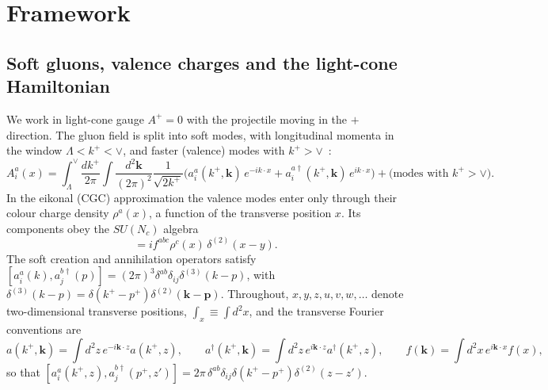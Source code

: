 \section{Framework}\label{sec:framework}

\subsection{Soft gluons, valence charges and the light-cone Hamiltonian}\label{sec:hamiltonian}

We work in light-cone gauge $A^+=0$ with the projectile moving in the $+$ direction. The gluon field is split into soft modes, with longitudinal momenta in the window $\Lambda<k^+<\vee$, and faster (valence) modes with $k^+>\vee$~\cite{Kovner:2005nq,Lublinsky:2016meo}:
\begin{equation}
A_i^a(x)=\int_{\Lambda}^{\vee}\frac{dk^+}{2\pi}\int\frac{d^2\mathbf k}{(2\pi)^2}\frac{1}{\sqrt{2k^+}}\Big(a_i^a(k^+,\mathbf k)\,e^{-ik\cdot x}+a_i^{a\dagger}(k^+,\mathbf k)\,e^{ik\cdot x}\Big)+\big(\text{modes with }k^+>\vee\big).
\label{eq:Asoft}
\end{equation}
In the eikonal (CGC) approximation the valence modes enter only through their colour charge density $\rho^a(x)$, a function of the transverse position $x$. Its components obey the $SU(N_c)$ algebra
\begin{equation}
[\rho^a(x),\rho^b(y)]=if^{abc}\rho^c(x)\,\delta^{(2)}(x-y).
\label{eq:rhoalg}
\end{equation}
The soft creation and annihilation operators satisfy $[a^a_i(k),a^{b\dagger}_j(p)]=(2\pi)^3\delta^{ab}\delta_{ij}\delta^{(3)}(k-p)$, with $\delta^{(3)}(k-p)=\delta(k^+-p^+)\delta^{(2)}(\mathbf k-\mathbf p)$. Throughout, $x,y,z,u,v,w,\ldots$ denote two-dimensional transverse positions, $\int_x\equiv\int d^2x$, and the transverse Fourier conventions are
\begin{equation}
a(k^+,\mathbf k)=\int d^2z\,e^{-i\mathbf k\cdot z}a(k^+,z),\qquad a^\dagger(k^+,\mathbf k)=\int d^2z\,e^{i\mathbf k\cdot z}a^\dagger(k^+,z),\qquad f(\mathbf k)=\int d^2x\,e^{i\mathbf k\cdot x}f(x),
\label{eq:FTconv}
\end{equation}
so that $[a^a_i(k^+,z),a^{b\dagger}_j(p^+,z')]=2\pi\,\delta^{ab}\delta_{ij}\delta(k^+-p^+)\delta^{(2)}(z-z')$.

